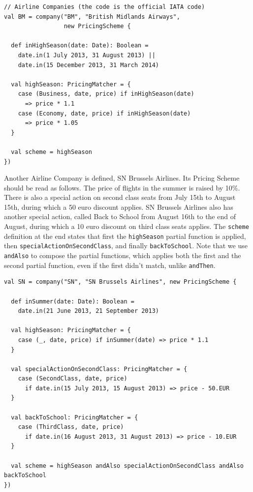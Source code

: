 \documentclass[a4paper]{article}
\newcommand{\cc}[1]{\texttt{#1}}
\renewcommand{\sc}[1]{\lstinline{#1}}
\begin{document}
\begin{lstlisting}
// Airline Companies (the code is the official IATA code)
val BM = company("BM", "British Midlands Airways",
                 new PricingScheme {

  def inHighSeason(date: Date): Boolean =
    date.in(1 July 2013, 31 August 2013) ||
    date.in(15 December 2013, 31 March 2014)

  val highSeason: PricingMatcher = {
    case (Business, date, price) if inHighSeason(date)
      => price * 1.1
    case (Economy, date, price) if inHighSeason(date)
      => price * 1.05
  }

  val scheme = highSeason
})
\end{lstlisting}

Another Airline Company is defined, SN Brussels Airlines.
Its Pricing Scheme should be read as follows.
The price of flights in the summer is raised by 10\%.
There is also a special action on second class seats from July 15th to August 15th, during which a 50 euro discount applies.
SN Brussels Airlines also has another special action, called Back to School from August 16th to the end of August, during which a 10 euro discount on third class seats applies.
The \sc{scheme} definition at the end states that first the \cc{highSeason} partial function is applied, then \cc{special\-Action\-On\-Second\-Class}, and finally \cc{backToSchool}.
Note that we use \sc{andAlso} to compose the partial functions, which applies both the first and the second partial function, even if the first didn't match, unlike \sc{andThen}.

\begin{lstlisting}
val SN = company("SN", "SN Brussels Airlines", new PricingScheme {

  def inSummer(date: Date): Boolean =
    date.in(21 June 2013, 21 September 2013)

  val highSeason: PricingMatcher = {
    case (_, date, price) if inSummer(date) => price * 1.1
  }

  val specialActionOnSecondClass: PricingMatcher = {
    case (SecondClass, date, price)
      if date.in(15 July 2013, 15 August 2013) => price - 50.EUR
  }

  val backToSchool: PricingMatcher = {
    case (ThirdClass, date, price)
      if date.in(16 August 2013, 31 August 2013) => price - 10.EUR
  }

  val scheme = highSeason andAlso specialActionOnSecondClass andAlso backToSchool
})
\end{lstlisting}
\end{document}
